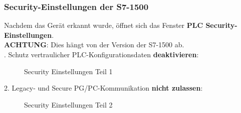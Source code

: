 \subsubsection{Security-Einstellungen der S7-1500}
Nachdem das Gerät erkannt wurde, öffnet sich das Fenster \textbf{PLC Security-Einstellungen}.\\
\textbf{ACHTUNG}: Dies hängt von der Version der S7-1500 ab.\\
. Schutz vertraulicher PLC-Konfigurationsdaten \textbf{deaktivieren}:
\begin{figure}[H]
   \centering
   \caption[Security Einstellungen Teil 1]{Security Einstellungen Teil 1}
   \label{fig:Bild6.13}
\end{figure}

\clearpage

2. Legacy- und Secure PG/PC-Kommunikation \textbf{nicht zulassen}:
\begin{figure}[H]
   \centering
   \caption[Security Einstellungen Teil 2]{Security Einstellungen Teil 2}
   \label{fig:Bild6.14}
\end{figure}

